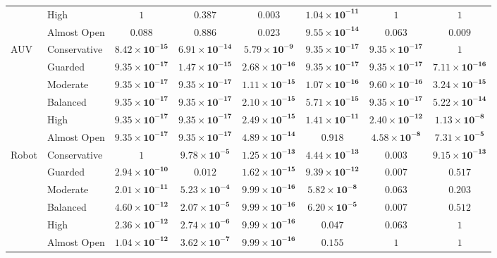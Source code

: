 \begin{table}[t]
\begin{tabular}{llcccccc}
     & High & $1$ & $0.387$ & $\mathbf{0.003}$ & $\mathbf{1.04\times10^{-11}}$ & $1$ & $1$ \\
     & Almost Open & $0.088$ & $0.886$ & $\mathbf{0.023}$ & $\mathbf{9.55\times10^{-14}}$ & $0.063$ & $\mathbf{0.009}$ \\
    \midrule
    AUV & Conservative & $\mathbf{8.42\times10^{-15}}$ & $\mathbf{6.91\times10^{-14}}$ & $\mathbf{5.79\times10^{-9}}$ & $\mathbf{9.35\times10^{-17}}$ & $\mathbf{9.35\times10^{-17}}$ & $1$ \\
     & Guarded & $\mathbf{9.35\times10^{-17}}$ & $\mathbf{1.47\times10^{-15}}$ & $\mathbf{2.68\times10^{-16}}$ & $\mathbf{9.35\times10^{-17}}$ & $\mathbf{9.35\times10^{-17}}$ & $\mathbf{7.11\times10^{-16}}$ \\
     & Moderate & $\mathbf{9.35\times10^{-17}}$ & $\mathbf{9.35\times10^{-17}}$ & $\mathbf{1.11\times10^{-15}}$ & $\mathbf{1.07\times10^{-16}}$ & $\mathbf{9.60\times10^{-16}}$ & $\mathbf{3.24\times10^{-15}}$ \\
     & Balanced & $\mathbf{9.35\times10^{-17}}$ & $\mathbf{9.35\times10^{-17}}$ & $\mathbf{2.10\times10^{-15}}$ & $\mathbf{5.71\times10^{-15}}$ & $\mathbf{9.35\times10^{-17}}$ & $\mathbf{5.22\times10^{-14}}$ \\
     & High & $\mathbf{9.35\times10^{-17}}$ & $\mathbf{9.35\times10^{-17}}$ & $\mathbf{2.49\times10^{-15}}$ & $\mathbf{1.41\times10^{-11}}$ & $\mathbf{2.40\times10^{-12}}$ & $\mathbf{1.13\times10^{-8}}$ \\
     & Almost Open & $\mathbf{9.35\times10^{-17}}$ & $\mathbf{9.35\times10^{-17}}$ & $\mathbf{4.89\times10^{-14}}$ & $0.918$ & $\mathbf{4.58\times10^{-8}}$ & $\mathbf{7.31\times10^{-5}}$ \\
    \midrule
    Robot & Conservative & $1$ & $\mathbf{9.78\times10^{-5}}$ & $\mathbf{1.25\times10^{-13}}$ & $\mathbf{4.44\times10^{-13}}$ & $\mathbf{0.003}$ & $\mathbf{9.15\times10^{-13}}$ \\
     & Guarded & $\mathbf{2.94\times10^{-10}}$ & $\mathbf{0.012}$ & $\mathbf{1.62\times10^{-15}}$ & $\mathbf{9.39\times10^{-12}}$ & $\mathbf{0.007}$ & $0.517$ \\
     & Moderate & $\mathbf{2.01\times10^{-11}}$ & $\mathbf{5.23\times10^{-4}}$ & $\mathbf{9.99\times10^{-16}}$ & $\mathbf{5.82\times10^{-8}}$ & $0.063$ & $0.203$ \\
     & Balanced & $\mathbf{4.60\times10^{-12}}$ & $\mathbf{2.07\times10^{-5}}$ & $\mathbf{9.99\times10^{-16}}$ & $\mathbf{6.20\times10^{-5}}$ & $\mathbf{0.007}$ & $0.512$ \\
     & High & $\mathbf{2.36\times10^{-12}}$ & $\mathbf{2.74\times10^{-6}}$ & $\mathbf{9.99\times10^{-16}}$ & $\mathbf{0.047}$ & $0.063$ & $1$ \\
     & Almost Open & $\mathbf{1.04\times10^{-12}}$ & $\mathbf{3.62\times10^{-7}}$ & $\mathbf{9.99\times10^{-16}}$ & $0.155$ & $1$ & $1$ \\
    \bottomrule
  \end{tabular}
\end{table}

